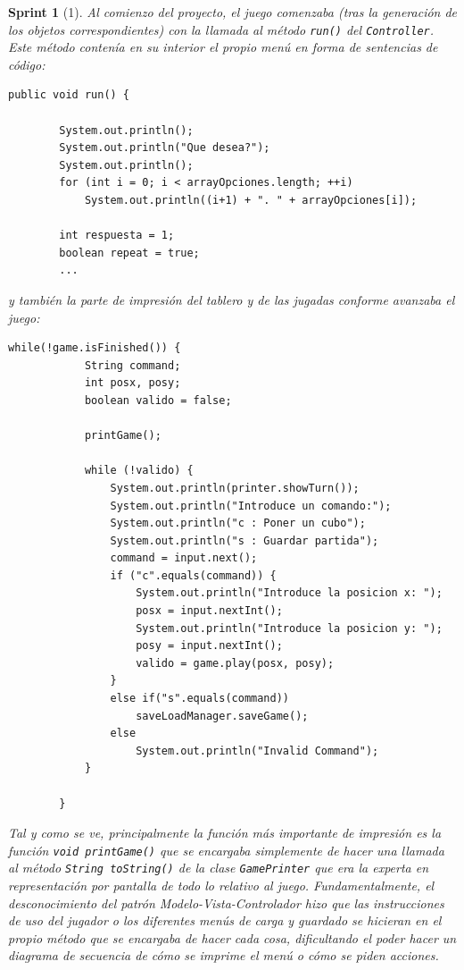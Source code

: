 \documentclass[12pt,a4paper,openright]{book}
\theoremstyle{break}
\newtheorem*{sprint}{Sprint}
\begin{document}
\begin{sprint}[1]
Al comienzo del proyecto, el juego comenzaba (tras la generación de los objetos correspondientes) con la llamada al método \texttt{run()} del \texttt{Controller}. Este método contenía en su interior el propio menú en forma de sentencias de código:
\begin{lstlisting}
public void run() {

		System.out.println();
		System.out.println("Que desea?");
		System.out.println();
		for (int i = 0; i < arrayOpciones.length; ++i)
			System.out.println((i+1) + ". " + arrayOpciones[i]);
		
		int respuesta = 1;
		boolean repeat = true;
		...
\end{lstlisting}
y también la parte de impresión del tablero y de las jugadas conforme avanzaba el juego:
\begin{lstlisting}
while(!game.isFinished()) {
			String command;
			int posx, posy;
			boolean valido = false;
			
			printGame();
			
			while (!valido) {
				System.out.println(printer.showTurn());
				System.out.println("Introduce un comando:");
				System.out.println("c : Poner un cubo");
				System.out.println("s : Guardar partida");
				command = input.next();
				if ("c".equals(command)) {
					System.out.println("Introduce la posicion x: ");
					posx = input.nextInt();
					System.out.println("Introduce la posicion y: ");
					posy = input.nextInt();
					valido = game.play(posx, posy);
				}					
				else if("s".equals(command))
					saveLoadManager.saveGame();
				else
					System.out.println("Invalid Command");										
			}
			
		}
\end{lstlisting}
Tal y como se ve, principalmente la función más importante de impresión es la función \texttt{void printGame()} que se encargaba simplemente de hacer una llamada al método \texttt{String toString()} de la clase \texttt{GamePrinter} que era la experta en representación por pantalla de todo lo relativo al juego. Fundamentalmente, el desconocimiento del patrón Modelo-Vista-Controlador hizo que las instrucciones de uso del jugador o los diferentes menús de carga y guardado se hicieran en el propio método que se encargaba de hacer cada cosa, dificultando el poder hacer un diagrama de secuencia de cómo se imprime el menú o cómo se piden acciones.
\end{sprint}
\end{document}
